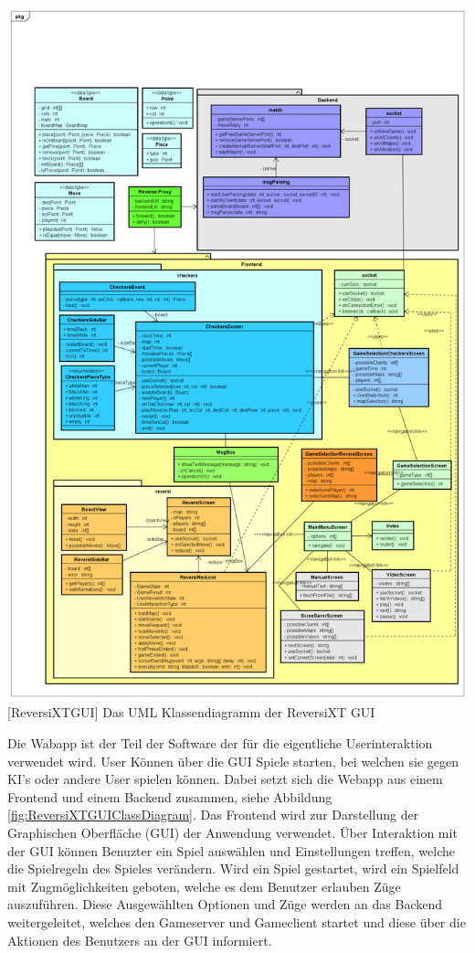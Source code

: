 \documentclass[12pt,a4paper,bibliography=totocnumbered,listof=totocnumbered]{article}
\begin{document}
\vspace{1em}
\begin{minipage}{\linewidth}
	\centering
	\includegraphics[width=0.9\linewidth]{pics/ReversiXTGUIClassDiagramm.png}
	[ReversiXTGUI]{ Das UML Klassendiagramm der ReversiXT GUI }
	\label{fig:ReversiXTGUIClassDiagram}
\end{minipage}

Die Wabapp ist der Teil der Software der für die eigentliche Userinteraktion verwendet wird. User Können über die GUI
Spiele starten, bei welchen sie gegen KI's oder andere User spielen können. Dabei setzt sich die Webapp aus einem Frontend und 
einem Backend zusammen, siehe Abbildung \ref{fig:ReversiXTGUIClassDiagram}. 
Das Frontend wird zur Darstellung der Graphischen Oberfläche (GUI) der Anwendung verwendet. Über Interaktion mit der 
GUI können Benuzter ein Spiel auswählen und Einstellungen treffen, welche die Spielregeln des Spieles verändern.
Wird ein Spiel gestartet, wird ein Spielfeld mit Zugmöglichkeiten geboten, welche es dem Benutzer erlauben 
Züge auszuführen.
Diese Ausgewählten Optionen und Züge werden an das Backend weitergeleitet, welches den Gameserver und Gameclient 
startet und diese über die Aktionen des Benutzers an der GUI informiert. 
\end{document}
